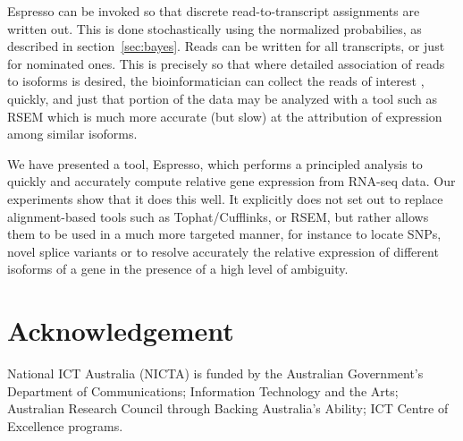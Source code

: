 \documentclass{bioinfo}
\newcommand{\Espresso}{Espresso}
\begin{document}
\Espresso{} can be invoked so that discrete read-to-transcript assignments
are written out.  This is done stochastically using the normalized
probabilies, as described in section~\ref{sec:bayes}. Reads can be
written for all transcripts, or just for nominated ones.  This is
precisely so that where detailed association of reads to isoforms
is desired, the bioinformatician can collect the reads of interest
\citep[c.f. our previous tool Electus;][]{Electus:2012},
quickly, and just
that portion of the data may be analyzed with a tool such as RSEM
which is much more accurate (but slow) at the attribution of
expression among similar isoforms.


We have presented a tool, \Espresso{}, which performs a principled analysis to
quickly and accurately compute relative gene expression from RNA-seq data.
Our experiments show that it does this well.
It explicitly does not set out to replace alignment-based tools such as Tophat/Cufflinks,
or RSEM, but rather allows them to be used in a much more targeted manner, for instance to
locate SNPs, novel splice variants or to resolve accurately the relative expression of
different isoforms of a gene in the presence of a high level of ambiguity.

\section*{Acknowledgement}

National ICT Australia (NICTA) is funded by the Australian Government's Department of Communications; 
Information Technology and the Arts;  
Australian Research Council through Backing Australia's Ability; 
ICT Centre of Excellence programs.




\end{document}
